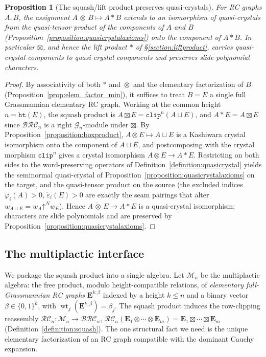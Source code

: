 \documentclass{amsart}
\newtheorem{proposition}[theorem]{Proposition}
\theoremstyle{definition}
\theoremstyle{remark}
\newcommand{\BRC}{\mathcal{BRC}}
\newcommand{\RC}{\mathcal{RC}}
\newcommand{\grass}{\mathcal{G}}
\newcommand{\Mn}{\mathcal{M}}
\newcommand{\shup}{\mathord{\uparrow}}
\newcommand{\wtt}{\operatorname{wt}}
\newcommand{\wof}[1]{w_{#1}}
\newcommand{\hr}{\mathtt{ht}}
\newcommand{\clp}{\mathtt{clip}}
\begin{document}
\begin{proposition}[The squash/lift product preserves quasi-crystals]\label{proposition:quasiprod}
For RC graphs $A,B$, the assignment $A\,\ddot\otimes\,B\mapsto A*B$ extends to an isomorphism of quasi-crystals from the quasi-tensor product of the components of $A$ and $B$ (Proposition~\ref{proposition:quasicrystalaxioms}) onto the component of $A*B$. In particular $\boxtimes$, and hence the lift product $*$ of \S\ref{section:liftproduct}, carries quasi-crystal components to quasi-crystal components and preserves slide-polynomial characters.
\end{proposition}
\begin{proof}
By associativity of both $*$ and $\ddot\otimes$ \cite[Theorem~5.1]{cain2023quasicrystals} and the elementary factorization of $B$ (Proposition~\ref{prop:elem_factor_min}), it suffices to treat $B=E$ a single full Grassmannian elementary RC graph. Working at the common height $n=\hr(E)$, the squash product is $A\boxtimes E=\clp^n(A\sqcup E)$, and $A*E=A\boxtimes E$ since $\BRC_n$ is a right $\grass_n$-module under $\boxtimes$. By Proposition~\ref{proposition:boxproduct}, $A\otimes E\mapsto A\sqcup E$ is a Kashiwara crystal isomorphism onto the component of $A\sqcup E$, and postcomposing with the crystal morphism $\clp^n$ gives a crystal isomorphism $A\otimes E\to A*E$. Restricting on both sides to the word-preserving operators of Definition~\ref{definition:quasicrystal} yields the seminormal quasi-crystal of Proposition~\ref{proposition:quasicrystalaxioms} on the target, and the quasi-tensor product on the source (the excluded indices $\ddot\varphi_i(A)>0$, $\ddot\varepsilon_i(E)>0$ are exactly the seam pairings that alter $\wof{A\sqcup E}=\wof{A}\shup^N\wof{E}$). Hence $A\,\ddot\otimes\,E\to A*E$ is a quasi-crystal isomorphism; characters are slide polynomials and are preserved by Proposition~\ref{proposition:quasicrystalaxioms}.
\end{proof}

\subsection{The multiplactic interface}

We package the squash product into a single algebra. Let $\Mn_n$ be the multiplactic algebra: the free product, modulo height-compatible relations, of \emph{elementary full-Grassmannian RC graphs} $\mathbf{E}^{k;\beta}$ indexed by a height $k\leq n$ and a binary vector $\beta\in\{0,1\}^k$, with $\wtt_j(\mathbf{E}^{k;\beta})=\beta_j$. The squash product induces the row-clipping reassembly $\RC_n:\Mn_n\to\BRC_n$, $\RC_n(\mathbf{E}_1\otimes\cdots\otimes\mathbf{E}_m)=\mathbf{E}_1\boxtimes\cdots\boxtimes\mathbf{E}_m$ (Definition~\ref{definition:squash}). The one structural fact we need is the unique elementary factorization of an RC graph compatible with the dominant Cauchy expansion.
\end{document}
